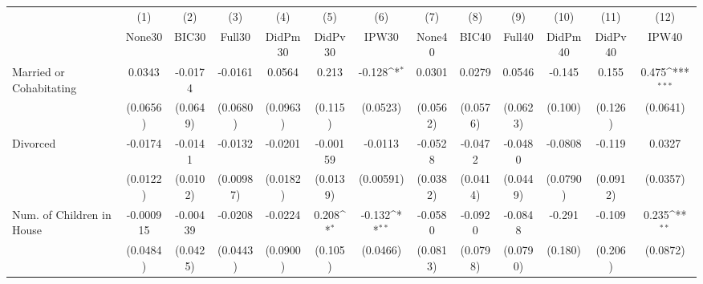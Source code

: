 {
\def\sym#1{\ifmmode^{#1}\else\(^{#1}\)\fi}
\begin{tabular}{l*{12}{c}}
\toprule
            &\multicolumn{1}{c}{(1)}&\multicolumn{1}{c}{(2)}&\multicolumn{1}{c}{(3)}&\multicolumn{1}{c}{(4)}&\multicolumn{1}{c}{(5)}&\multicolumn{1}{c}{(6)}&\multicolumn{1}{c}{(7)}&\multicolumn{1}{c}{(8)}&\multicolumn{1}{c}{(9)}&\multicolumn{1}{c}{(10)}&\multicolumn{1}{c}{(11)}&\multicolumn{1}{c}{(12)}\\
            &\multicolumn{1}{c}{None30}&\multicolumn{1}{c}{BIC30}&\multicolumn{1}{c}{Full30}&\multicolumn{1}{c}{DidPm30}&\multicolumn{1}{c}{DidPv30}&\multicolumn{1}{c}{IPW30}&\multicolumn{1}{c}{None40}&\multicolumn{1}{c}{BIC40}&\multicolumn{1}{c}{Full40}&\multicolumn{1}{c}{DidPm40}&\multicolumn{1}{c}{DidPv40}&\multicolumn{1}{c}{IPW40}\\
\midrule
Married or Cohabitating&      0.0343         &     -0.0174         &     -0.0161         &      0.0564         &       0.213         &      -0.128\sym{*}  &      0.0301         &      0.0279         &      0.0546         &      -0.145         &       0.155         &       0.475\sym{***}\\
            &    (0.0656)         &    (0.0649)         &    (0.0680)         &    (0.0963)         &     (0.115)         &    (0.0523)         &    (0.0562)         &    (0.0576)         &    (0.0623)         &     (0.100)         &     (0.126)         &    (0.0641)         \\
\addlinespace
Divorced    &     -0.0174         &     -0.0141         &     -0.0132         &     -0.0201         &    -0.00159         &     -0.0113         &     -0.0528         &     -0.0472         &     -0.0480         &     -0.0808         &      -0.119         &      0.0327         \\
            &    (0.0122)         &    (0.0102)         &   (0.00987)         &    (0.0182)         &    (0.0139)         &   (0.00591)         &    (0.0382)         &    (0.0414)         &    (0.0449)         &    (0.0790)         &    (0.0912)         &    (0.0357)         \\
\addlinespace
Num. of Children in House&   -0.000915         &    -0.00439         &     -0.0208         &     -0.0224         &       0.208\sym{*}  &      -0.132\sym{**} &     -0.0580         &     -0.0920         &     -0.0848         &      -0.291         &      -0.109         &       0.235\sym{**} \\
            &    (0.0484)         &    (0.0425)         &    (0.0443)         &    (0.0900)         &     (0.105)         &    (0.0466)         &    (0.0813)         &    (0.0798)         &    (0.0790)         &     (0.180)         &     (0.206)         &    (0.0872)         \\

\end{tabular}}
